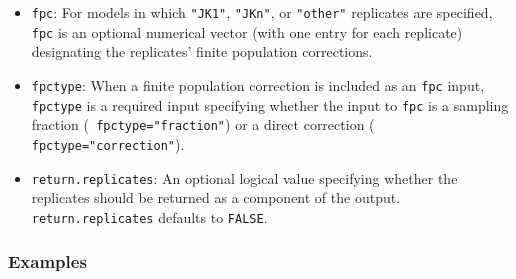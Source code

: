 \begin{enumerate}
\begin{itemize}
\item {\tt fpc}: For models in which {\tt "JK1"}, {\tt "JKn"}, or 
{\tt "other"} replicates are specified, {\tt fpc} is an optional 
numerical vector (with one entry for each replicate) designating the 
replicates' finite population corrections.   

\item {\tt fpctype}: When a finite population correction is included 
as an {\tt fpc} input, {\tt fpctype} is a required input specifying 
whether the input to {\tt fpc} is a sampling fraction ({\tt 
fpctype="fraction"}) or a direct correction ({\tt 
fpctype="correction"}).  

\item {\tt return.replicates}: An optional logical value    
specifying whether the replicates should be returned as a component 
of the output.  {\tt return.replicates} defaults to {\tt FALSE}.  

\end{itemize}

\end{enumerate}

\subsubsection{Examples}

